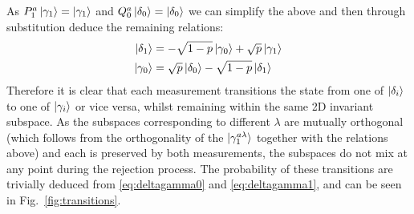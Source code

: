 \documentclass[aps,floatfix,10pt,amssymb,amsfont,amsmath,superscriptaddress,float,nofootinbib,longbibliography,nobalancelastpage,twocolumn]{revtex4-2}
\begin{document}
As $P^a_1 \ket{\gamma_1} = \ket{\gamma_1}$ and $Q^a_0\ket{\delta_0} = \ket{\delta_0}$ we can simplify the above and then through substitution deduce the remaining relations:
\begin{align}
\begin{split}
\label{eq:deltagamma1}
        \ket{\delta_1} &= -\sqrt{1-p} \ket{\gamma_0} + \sqrt{p} \ket{\gamma_1}\\
    \ket{\gamma_0} &= \sqrt{p} \ket{\delta_0} - \sqrt{1-p}\ket{\delta_1}
\end{split}
\end{align}
Therefore it is clear that each measurement transitions the state from one of $\ket{\delta_i}$ to one of $\ket{\gamma_i}$ or vice versa, whilst remaining within the same 2D invariant subspace. As the subspaces corresponding to different $\lambda$ are mutually orthogonal (which follows from the orthogonality of the $\ket{\gamma^{a\lambda}_1}$ together with the relations above) and each is preserved by both measurements, the subspaces do not mix at any point during the rejection process. The probability of these transitions are trivially deduced from \eqref{eq:deltagamma0} and \eqref{eq:deltagamma1}, and can be seen in Fig.~\ref{fig:transitions}.
\end{document}
